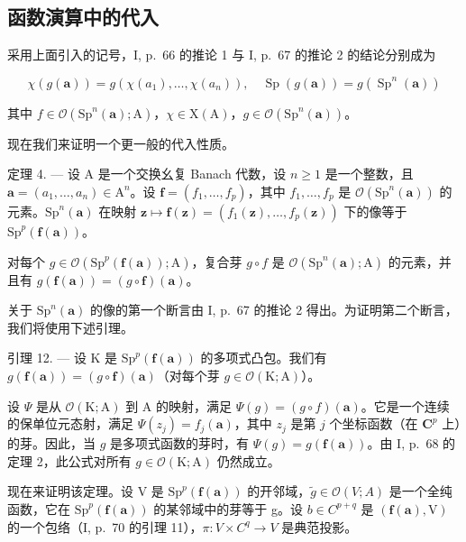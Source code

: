 \subsection{函数演算中的代入}

采用上面引入的记号，I, p.~66 的推论 1 与 I, p.~67 的推论 2 的结论分别成为

\[
\chi (g (\boldsymbol {a})) = g \left(\chi \left(a _ {1}\right), \dots , \chi \left(a _ {n}\right)\right), \quad \operatorname{Sp} (g (\boldsymbol {a})) = g \left(\operatorname{Sp} ^ {n} (\boldsymbol {a})\right)
\]

其中 \(f \in \mathcal{O}(\mathrm{Sp}^n(\boldsymbol{a});\mathrm{A})\)，\(\chi \in \mathrm{X}(\mathrm{A})\)，\(g \in \mathcal{O}(\mathrm{Sp}^n(\boldsymbol{a}))\)。

现在我们来证明一个更一般的代入性质。

定理 4. --- 设 A 是一个交换幺复 Banach 代数，设 \(n \geqslant 1\) 是一个整数，且 \(\boldsymbol{a} = (a_1, \ldots, a_n) \in \mathrm{A}^n\)。设 \(\boldsymbol{f} = (f_1, \ldots, f_p)\)，其中 \(f_1, \ldots, f_p\) 是 \(\mathcal{O}(\mathrm{Sp}^n(\boldsymbol{a}))\) 的元素。\(\mathrm{Sp}^n(\boldsymbol{a})\) 在映射 \(\boldsymbol{z} \mapsto \boldsymbol{f}(\boldsymbol{z}) = (f_1(\boldsymbol{z}), \ldots, f_p(\boldsymbol{z}))\) 下的像等于 \(\mathrm{Sp}^p(\boldsymbol{f}(\boldsymbol{a}))\)。

对每个 \(g \in \mathcal{O}(\mathrm{Sp}^{p}(\boldsymbol{f}(\boldsymbol{a}));\mathrm{A})\)，复合芽 \(g \circ f\) 是 \(\mathcal{O}(\mathrm{Sp}^{n}(\boldsymbol{a});\mathrm{A})\) 的元素，并且有 \(g(\boldsymbol{f}(\boldsymbol{a})) = (g \circ \boldsymbol{f})(\boldsymbol{a})\)。

关于 \(\mathrm{Sp}^{n}(\boldsymbol{a})\) 的像的第一个断言由 I, p.~67 的推论 2 得出。为证明第二个断言，我们将使用下述引理。

引理 12. --- 设 K 是 \(\mathrm{Sp}^p (\pmb {f}(\pmb {a}))\) 的多项式凸包。我们有 \(g(\pmb {f}(\pmb {a})) = (g\circ \pmb {f})(\pmb {a})\)（对每个芽 \(g\in \mathcal{O}(\mathrm{K};\mathrm{A})\)）。

设 \(\Psi\) 是从 \(\mathcal{O}(\mathrm{K};\mathrm{A})\) 到 A 的映射，满足 \(\Psi(g) = (g\circ f)(\boldsymbol{a})\)。它是一个连续的保单位元态射，满足 \(\Psi(z_j) = f_j(\boldsymbol{a})\)，其中 \(z_{j}\) 是第 \(j\) 个坐标函数（在 \(\mathbf{C}^p\) 上）的芽。因此，当 \(g\) 是多项式函数的芽时，有 \(\Psi(g) = g(\boldsymbol{f}(\boldsymbol{a}))\)。由 I, p.~68 的定理 2，此公式对所有 \(g\in \mathcal{O}(\mathrm{K};\mathrm{A})\) 仍然成立。

现在来证明该定理。设 V 是 \(\mathrm{Sp}^{p}(\boldsymbol{f}(\boldsymbol{a}))\) 的开邻域，\(\widetilde{g}\in\mathcal{O}(V;A)\) 是一个全纯函数，它在 \(\mathrm{Sp}^{p}(\boldsymbol{f}(\boldsymbol{a}))\) 的某邻域中的芽等于 g。设 \(b\in C^{p+q}\) 是 \((\boldsymbol{f}(\boldsymbol{a}),\mathrm{V})\) 的一个包络（I, p.~70 的引理 11），\(\pi\colon V\times C^{q}\to V\) 是典范投影。

